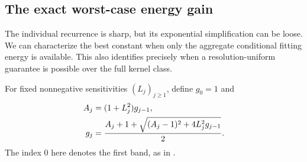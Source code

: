 \subsection{The exact worst-case energy gain}\label{sec:optimal-gain}
The individual recurrence is sharp, but its exponential simplification can be loose. We can characterize the best constant when only the aggregate conditional fitting energy is available. This also identifies precisely when a resolution-uniform guarantee is possible over the full kernel class.

For fixed nonnegative sensitivities $(L_j)_{j\ge1}$, define $g_0=1$ and
\begin{align}\label{eq:optimal-gain}
 A_j&=(1+L_j^2)g_{j-1},\\
 g_j&=\frac{A_j+1+\sqrt{(A_j-1)^2+4L_j^2g_{j-1}}}{2}.
 \notag
\end{align}
The index $0$ here denotes the first band, as in .

